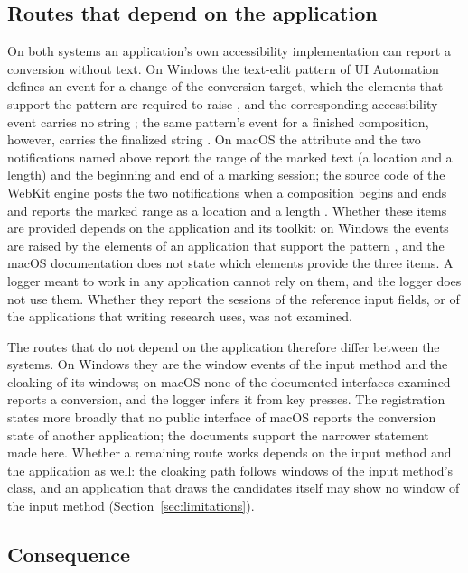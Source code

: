 \subsection{Routes that depend on the application}
\label{sec:observability-application}

On both systems an application's own accessibility implementation can report a conversion without text. On Windows
the text-edit pattern of UI Automation defines an event for a change of the conversion target, which the elements that
support the pattern are required to raise \citep{ms-uia-textedit}, and the corresponding accessibility event carries
no string \citep{ms-eventconstants,ms-wineventproc}; the same pattern's event for a finished composition, however, carries the
finalized string \citep{ms-uia-textedit}. On macOS the attribute and the two notifications named above report the
range of the marked text (a location and a length) and the beginning and end of a marking session; the source code of
the WebKit engine posts the two notifications when a composition begins and ends and reports the marked range as a
location and a length \citep{webkit2026}. Whether these items are provided depends on the application and its
toolkit: on Windows the events are raised by the elements of an application that support the pattern
\citep{ms-uia-textedit}, and the macOS documentation does not state which elements provide the three items. A
logger meant to work in any application cannot rely on them, and the logger does not use them. Whether they report
the sessions of the reference input fields, or of the applications that writing research uses, was not examined.

The routes that do not depend on the application therefore differ between the systems. On Windows they are the window
events of the input method and the cloaking of its windows; on macOS none of the documented interfaces examined
reports a conversion, and the logger infers it from key presses. The registration states more broadly that no public
interface of macOS reports the conversion state of another application; the documents support the narrower
statement made here. Whether a remaining route works depends on the input method and the application as well: the
cloaking path follows windows of the input method's class, and an application that draws the candidates itself may
show no window of the input method (Section~\ref{sec:limitations}).

\subsection{Consequence}
\label{sec:observability-consequence}

